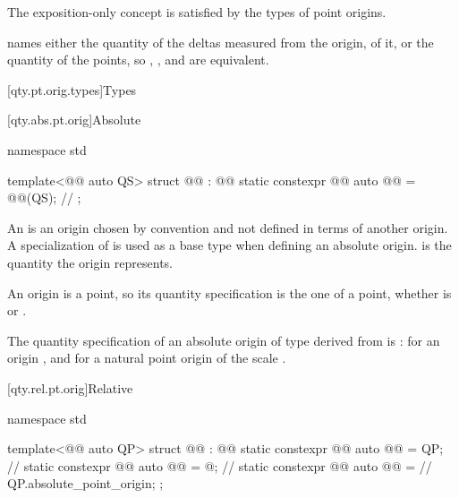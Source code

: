 \pnum
The exposition-only concept  is satisfied by the types of point origins.

\pnum
\begin{note}
 names either the quantity of the deltas measured from the origin,  of it,
or the quantity of the points,
so ,
, and
 are equivalent.
\end{note}

[qty.pt.orig.types]{Types}

[qty.abs.pt.orig]{Absolute}

\begin{codeblock}
namespace std {

template<@@ auto QS>
struct @@ : @@ {
  static constexpr @@ auto @@ = @@(QS);  // \expos
};

}
\end{codeblock}

\pnum
An  is an origin
chosen by convention and not defined in terms of another origin.
A specialization of  is used as a base type when defining an absolute origin.
 is the quantity the origin represents.
\begin{note}
An origin is a point,
so its quantity specification  is the one of a point,
whether  is  or .
\end{note}

\pnum
The quantity specification 
of an absolute origin  of type  derived from  is
:
 for an origin
,
and  for a natural point origin of the scale .

[qty.rel.pt.orig]{Relative}

\begin{codeblock}
namespace std {

template<@@ auto QP>
struct @@ : @@ {
  static constexpr @@ auto @@ = QP;       // \expos
  static constexpr @@ auto @@ = @\seebelownc@;  // \expos
  static constexpr @@ auto @@ =      // \expos
    QP.absolute_point_origin;
};

}
\end{codeblock}

